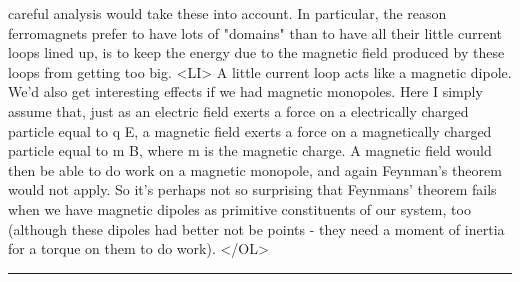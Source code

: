 careful analysis would take these into account.  In particular,
the reason ferromagnets prefer to have lots of "domains" than to have
all their little current loops lined up, is to keep the energy
due to the magnetic field produced by these loops from getting too big.
<LI>
A little current loop acts like a magnetic dipole.  We'd
also get interesting effects if we had magnetic monopoles. 
Here I simply assume that, just as an electric field exerts a force on
a electrically charged particle equal to q E, a magnetic field
exerts a force on a magnetically charged particle equal to m B,
where m is the magnetic charge.  A magnetic field would then
be able to do work on a magnetic monopole, and again Feynman's
theorem would not apply.  So it's perhaps not so surprising that
Feynmans' theorem fails when we have magnetic dipoles as primitive
constituents of our system, too (although these dipoles had better
not be points - they need a moment of inertia for a torque on
them to do work).  
</OL>
\par\noindent\rule{\textwidth}{0.4pt}

